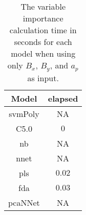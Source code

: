 \begin{table}[!ht]
	\centering
	\begin{tabular}{|c|c|}
		\hline
		Model & elapsed \\ \hline
		svmPoly & NA \\ \hline
		C5.0 & $0$ \\ \hline
		nb & NA \\ \hline
		nnet & NA \\ \hline
		pls & $0.02$ \\ \hline
		fda & $0.03$ \\ \hline
		pcaNNet & NA \\ \hline
	\end{tabular}
	\caption{The variable importance calculation time in seconds for each model when using only $B_{x}$, $B_{y}$, and $a_{p}$ as input.}
	\label{tab:time:xyap:importance}
\end{table}
